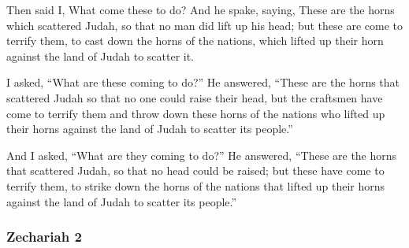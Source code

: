 			\begin{versebox}
					\item[BHS] 
					\item[LXX] 
					\item[ASV] Then said I, What come these to do? And he spake, saying, These are the horns which scattered Judah, so that no man did lift up his head; but these are come to terrify them, to cast down the horns of the nations, which lifted up their horn against the land of Judah to scatter it.
					\item[NIV] I asked, “What are these coming to do?” He answered, “These are the horns that scattered Judah so that no one could raise their head, but the craftsmen have come to terrify them and throw down these horns of the nations who lifted up their horns against the land of Judah to scatter its people.”
					\item[NRSV] And I asked, “What are they coming to do?” He answered, “These are the horns that scattered Judah, so that no head could be raised; but these have come to terrify them, to strike down the horns of the nations that lifted up their horns against the land of Judah to scatter its people.”
			\end{versebox}
	\subsubsection{Zechariah 2} %
		\label{ZECHARIAH-2}

